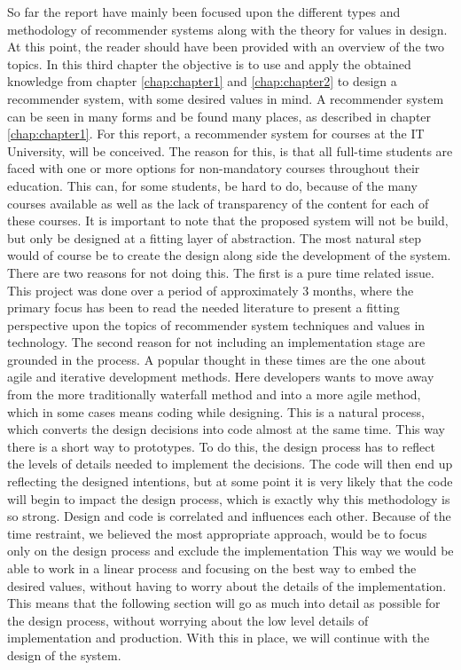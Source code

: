 So far the report have mainly been focused upon the different types and methodology of recommender systems along with the theory for values in design. At this point, the reader should have been provided with an overview of the two topics. In this third chapter the objective is to use and apply the obtained knowledge from chapter \ref{chap:chapter1} and \ref{chap:chapter2} to design a recommender system, with some desired values in mind.\newline 
A recommender system can be seen in many forms and be found many places, as described in chapter \ref{chap:chapter1}. For this report, a recommender system for courses at the IT University, will be conceived. The reason for this, is that all full-time students are faced with one or more options for non-mandatory courses throughout their education. This can, for some students, be hard to do, because of the many courses available as well as the lack of transparency of the content for each of these courses.\newline
It is important to note that the proposed system will not be build, but only be designed at a fitting layer of abstraction. The most natural step would of course be to create the design along side the development of the system. There are two reasons for not doing this. The first is a pure time related issue. This project was done over a period of approximately 3 months, where the primary focus has been to read the needed literature to present a fitting perspective upon the topics of recommender system techniques and values in technology. The second reason for not including an implementation stage are grounded in the process. A popular thought in these times are the one about agile and iterative development methods. Here developers wants to move away from the more traditionally waterfall method and into a more agile method, which in some cases means coding while designing. This is a natural process, which converts the design decisions into code almost at the same time. This way there is a short way to prototypes. To do this, the design process has to reflect the levels of details needed to implement the decisions. The code will then end up reflecting the designed intentions, but at some point it is very likely that the code will begin to impact the design process, which is exactly why this methodology is so strong. Design and code is correlated and influences each other. Because of the time restraint, we believed the most appropriate approach, would be to focus only on the design process and exclude the implementation This way we would be able to work in a linear process and focusing on the best way to embed the desired values, without having to worry about the details of the implementation.\\
This means that the following section will go as much into detail as possible for the design process, without worrying about the low level details of implementation and production. With this in place, we will continue with the design of the system. 


